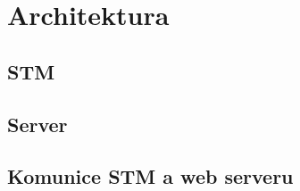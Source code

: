 \chapter{Architektura}

\section{STM}







\section{Server}

\section{Komunice STM a web serveru}

